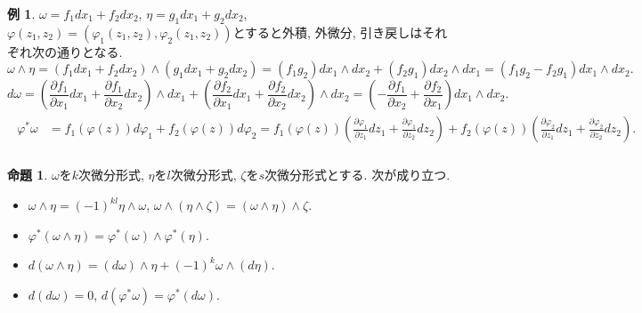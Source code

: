 \documentclass[dvipdfmx,a4paper,11pt]{article}
\theoremstyle{definition}
\newtheorem{prop}[thm]{命題}
\newtheorem{exa}[thm]{例}
\newtheorem{rem}[thm]{補足}
\newcommand{\pdrv}[2]{\frac{\partial #1}{\partial #2}}
\begin{document}
 
 \begin{exa}
 $\omega=f_1dx_1+ f_2dx_2$,  $\eta=g_1dx_1+ g_2dx_2$, $\varphi (z_1, z_2) = (\varphi_1(z_1,z_2), \varphi_2(z_1,z_2))$とすると外積, 外微分, 引き戻しはそれぞれ次の通りとなる. 
 $$
 \omega \wedge \eta = (f_1dx_1+ f_2dx_2) \wedge (g_1dx_1+ g_2dx_2)
 = (f_1g_2)dx_1 \wedge dx_2 + (f_2g_1)dx_2 \wedge dx_1 = (f_1g_2 - f_2 g_1) dx_1 \wedge dx_2.
 $$
 $$
 d \omega = \left(\pdrv{f_1}{x_1} dx_1+ \pdrv{f_1}{x_2} dx_2\right) \wedge dx_1 + \left(\pdrv{f_2}{x_1} dx_1+ \pdrv{f_2}{x_2} dx_2\right) \wedge dx_2
= \left( -\pdrv{f_1}{x_2} + \pdrv{f_2}{x_1}\right)dx_1 \wedge dx_2.
 $$
 \begin{align*}
\begin{split}
 \varphi^{*}\omega
& =
 f_{1} (\varphi(z)) d\varphi_{1} +  f_{2} (\varphi(z)) d\varphi_{2}
 =
  f_{1} (\varphi(z)) \left(\pdrv{\varphi_1}{z_1} dz_1 + \pdrv{\varphi_1}{z_2} dz_2 \right) 
  +  f_{2} (\varphi(z)) \left(\pdrv{\varphi_2}{z_1} dz_1 + \pdrv{\varphi_2}{z_2} dz_2 \right). \\
\end{split}
 \end{align*}
 
 \end{exa}


  \begin{tcolorbox}[
    colback = white,
    colframe = green!35!black,
    fonttitle = \bfseries,
    breakable = true]
\begin{prop}
$\omega$を$k$次微分形式, $\eta$を$l$次微分形式, $\zeta$を$s$次微分形式とする. 次が成り立つ.
\begin{itemize}
 \setlength{\parskip}{0cm}
  \setlength{\itemsep}{2pt} 
\item$\omega \wedge \eta = (-1)^{kl} \eta \wedge \omega$, $\omega \wedge (\eta  \wedge \zeta)= (\omega \wedge \eta)  \wedge \zeta$. 
\item $\varphi^{*}(\omega \wedge \eta) = \varphi^{*}(\omega) \wedge \varphi^{*}(\eta)$.
\item $d(\omega \wedge \eta ) = (d \omega) \wedge \eta + (-1)^{k}\omega \wedge (d \eta)$.
    \item $d(d \omega)=0$, $d(\varphi^{*}\omega)=\varphi^{*}(d \omega)$.
\end{itemize}
    \end{prop}
    \end{tcolorbox}
  
\end{document}
